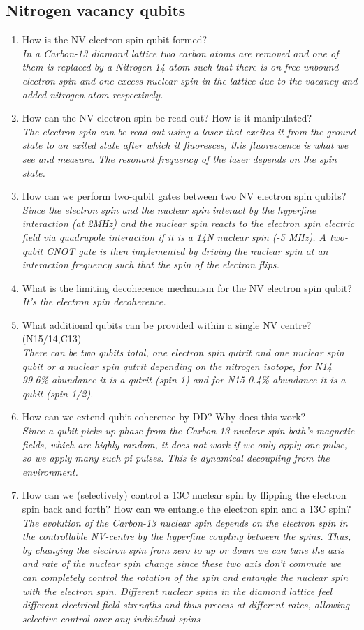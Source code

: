 \documentclass[a4paper]{scrartcl}
\newcommand{\qa}[2]{#1\\ \textit{#2}}
\begin{document}
\subsection*{Nitrogen vacancy qubits}
\begin{enumerate}
  \item \qa{How is the NV electron spin qubit formed?}{In a Carbon-13 diamond lattice two carbon atoms are removed and one of them is replaced by a Nitrogen-14 atom such that there is on free unbound electron spin and one excess nuclear spin in the lattice due to the vacancy and added nitrogen atom respectively.}
  \item \qa{How can the NV electron spin be read out? How is it manipulated?}{The electron spin can be read-out using a laser that excites it from the ground state to an exited state after which it fluoresces, this fluorescence is what we see and measure. The resonant frequency of the laser depends on the spin state.}
  \item \qa{How can we perform two-qubit gates between two NV electron spin qubits?}{Since the electron spin and the nuclear spin interact by the hyperfine interaction (at 2MHz) and the nuclear spin reacts to the electron spin electric field via quadrupole interaction if it is a 14N nuclear spin (-5 MHz). A two-qubit CNOT gate is then implemented by driving the nuclear spin at an interaction frequency such that the spin of the electron flips.}
  \item \qa{What is the limiting decoherence mechanism for the NV electron spin qubit?}{It's the electron spin decoherence.}
  \item \qa{What additional qubits can be provided within a single NV centre? (N15/14,C13)}{There can be two qubits total, one electron spin qutrit and one nuclear spin qubit or a nuclear spin qutrit depending on the nitrogen isotope, for N14 99.6\% abundance it is a qutrit (spin-1) and for N15 0.4\% abundance it is a qubit (spin-1/2).}
  \item \qa{How can we extend qubit coherence by DD? Why does this work?}{Since a qubit picks up phase from the Carbon-13 nuclear spin bath's magnetic fields, which are highly random, it does not work if we only apply one pulse, so we apply many such pi pulses. This is dynamical decoupling from the environment.}
  \item \qa{How can we (selectively) control a 13C nuclear spin by flipping the electron spin back and forth? How can we entangle the electron spin and a 13C spin?}{The evolution of the Carbon-13 nuclear spin depends on the electron spin in the controllable NV-centre by the hyperfine coupling between the spins. Thus, by changing the electron spin from zero to up or down we can tune the axis and rate of the nuclear spin change since these two axis don't commute we can completely control the rotation of the spin and entangle the nuclear spin with the electron spin. Different nuclear spins in the diamond lattice feel different electrical field strengths and thus precess at different rates, allowing selective control over any individual spins}

\end{enumerate}
\end{document}

